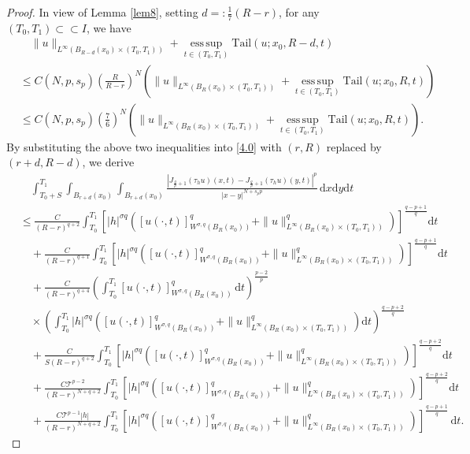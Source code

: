 \documentclass[reqno,10pt]{amsart}
\numberwithin{equation}{section}
\begin{document}
\begin{proof}
	In view of Lemma \ref{lem8}, setting $d=:\frac{1}{7}(R-r)$, for any $(T_0,T_1)\subset\subset I$, we have
	\begin{align*}
		&\quad\|u\|_{L^\infty(B_{R-d}(x_0)\times(T_0,T_1))}+\operatorname*{ess\,sup}_{t\in(T_0,T_1)}\mathrm{Tail}(u;x_0,R-d,t)\\
		&\le C(N,p,s_p)\left( \frac{R}{R-r}\right)^N\left(\|u\|_{L^\infty(B_R(x_0)\times(T_0,T_1))}+\operatorname*{ess\,sup}_{t\in(T_0,T_1)}\mathrm{Tail}(u;x_0,R,t)\right)\\
		&\le C(N,p,s_p)\left( \frac{7}{6}\right)^N\left(\|u\|_{L^\infty(B_R(x_0)\times(T_0,T_1))}+\operatorname*{ess\,sup}_{t\in(T_0,T_1)}\mathrm{Tail}(u;x_0,R,t)\right).
	\end{align*}
	By substituting the above two inequalities into \eqref{4.0} with $(r, R)$ replaced by $(r+d, R-d)$, we derive
	\begin{align}
		\label{6.1}
		&\quad\int_{T_0+S}^{T_1}\int_{B_{r+d}(x_0)}\int_{B_{r+d}(x_0)}\frac{\left| J_{\frac{q}{p}+1}(\tau_hu)(x,t)-J_{\frac{q}{p}+1}(\tau_hu)(y,t)\right|^p}{|x-y|^{N+s_pp}}\,\mathrm{d}x\mathrm{d}y\mathrm{d}t\nonumber\\
		&\le \frac{C}{(R-r)^{q+2}}\int_{T_0}^{T_1}\left[|h|^{\sigma q}\left([u(\cdot,t)]^q_{W^{\sigma,q}(B_R(x_0))}+\|u\|^q_{L^\infty\left( B_{R}(x_0)\times(T_0,T_1)\right) }\right)\right]^{\frac{q-p+1}{q}}\mathrm{d}t\nonumber\\
		&\quad+\frac{C}{(R-r)^{q+1}}\int_{T_0}^{T_1}\left[|h|^{\sigma q}\left([u(\cdot,t)]^q_{W^{\sigma,q}(B_R(x_0))}+\|u\|^q_{L^\infty\left( B_{R}(x_0)\times(T_0,T_1)\right) }\right)\right]^{\frac{q-p+1}{q}}\mathrm{d}t\nonumber\\
		&\quad+\frac{C}{(R-r)^{q+4}}\left( \int_{T_0}^{T_1}[u(\cdot,t)]^{q}_{W^{\sigma,q}(B_R(x_0))}\,\mathrm{d}t\right)^\frac{p-2}{p}\nonumber\\
		&\quad\times\left(\int_{T_0}^{T_1}|h|^{\sigma q}\left([u(\cdot,t)]^q_{W^{\sigma,q}(B_R(x_0))}+\|u\|^q_{L^\infty\left( B_{R}(x_0)\times(T_0,T_1)\right) }\right)\mathrm{d}t\right)^{\frac{q-p+2}{q}}\nonumber\\
		&\quad+\frac{C}{S(R-r)^{q+2}}\int_{T_0}^{T_1}\left[|h|^{\sigma q}\left([u(\cdot,t)]^q_{W^{\sigma,q}(B_R(x_0))}+\|u\|^q_{L^\infty\left( B_{R}(x_0)\times(T_0,T_1)\right) }\right)\right]^{\frac{q-p+2}{q}}\mathrm{d}t\nonumber\\
		&\quad+\frac{C\mathcal{T}^{p-2}}{(R-r)^{N+q+2}}\int_{T_0}^{T_1}\left[|h|^{\sigma q}\left([u(\cdot,t)]^q_{W^{\sigma,q}(B_R(x_0))}+\|u\|^q_{L^\infty\left( B_{R}(x_0)\times(T_0,T_1)\right) }\right)\right]^{\frac{q-p+2}{q}}\mathrm{d}t\nonumber\\
		&\quad+\frac{C\mathcal{T}^{p-1}|h|}{(R-r)^{N+q+2}}\int_{T_0}^{T_1}\left[|h|^{\sigma q}\left([u(\cdot,t)]^q_{W^{\sigma,q}(B_R(x_0))}+\|u\|^q_{L^\infty\left( B_{R}(x_0)\times(T_0,T_1)\right) }\right)\right]^{\frac{q-p+1}{q}}\,\mathrm{d}t.
	\end{align}
	

\end{proof}
\end{document}
